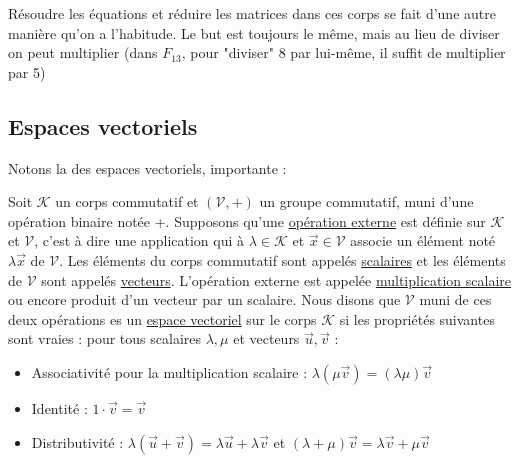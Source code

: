 \documentclass[11pt,a4paper]{article}
\newcommand{\m}[1]{\ensuremath{\mathcal{#1}}}
\begin{document}
Résoudre les équations et réduire les matrices dans ces corps se fait d'une autre manière qu'on a l'habitude. Le but est toujours le même, mais au lieu de diviser on peut multiplier (dans $F_{13}$, pour "diviser" 8 par lui-même, il suffit de multiplier par 5)

\subsection{Espaces vectoriels}
Notons la  des espaces vectoriels, importante :

Soit $\mathcal{K}$ un corps commutatif et $(\mathcal{V},\mathcal{+})$ un groupe commutatif, muni d'une opération binaire notée +. Supposons qu'une \uline{opération externe} est définie sur $\m{K}$ et $\m{V}$, c'est à dire une application qui à $\lambda \in \m{K}$ et $\vec{x} \in \m{V}$ associe un élément noté $\lambda\vec{x}$ de \m{V}. Les éléments du corps commutatif sont appelés \uline{scalaires} et les éléments de \m{V} sont appelés \uline{vecteurs}. L'opération externe est appelée \uline{multiplication scalaire} ou encore produit d'un vecteur par un scalaire. Nous disons que \m{V} muni de ces deux opérations es un \uline{espace vectoriel} sur le corps \m{K} si les propriétés suivantes sont vraies : pour tous scalaires $\lambda,\mu$ et vecteurs $\vec{u},\vec{v}$ :
\begin{itemize}
	\item 	Associativité pour la multiplication scalaire : $\lambda(\mu \vec{v}) = (\lambda\mu)\vec{v}$
	\item 	Identité : $1\cdot\vec{v} = \vec{v}$
	\item 	Distributivité : $\lambda(\vec{u}+\vec{v}) = \lambda\vec{u} + \lambda\vec{v}$ et $(\lambda + \mu)\vec{v} = \lambda\vec{v} + \mu\vec{v}$
\end{itemize}
\end{document}
